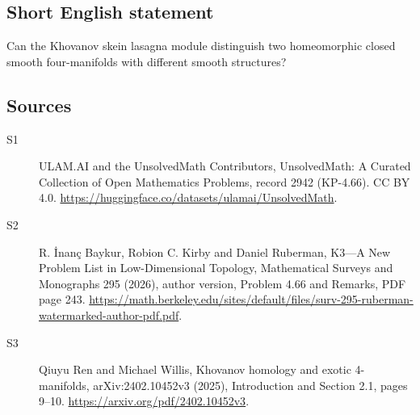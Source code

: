 \documentclass[11pt]{article}
\begin{document}
\subsection{Short English statement}
Can the Khovanov skein lasagna module distinguish two homeomorphic closed smooth four-manifolds with different smooth structures?
\subsection{Sources}
\begin{description}
\item[\hypertarget{source:2942:1}{S1}] ULAM.AI and the UnsolvedMath Contributors, UnsolvedMath: A Curated Collection of Open Mathematics Problems, record 2942 (KP-4.66). CC BY 4.0. \url{https://huggingface.co/datasets/ulamai/UnsolvedMath}.
\item[\hypertarget{source:2942:2}{S2}] R. İnanç Baykur, Robion C. Kirby and Daniel Ruberman, K3—A New Problem List in Low-Dimensional Topology, Mathematical Surveys and Monographs 295 (2026), author version, Problem 4.66 and Remarks, PDF page 243. \url{https://math.berkeley.edu/sites/default/files/surv-295-ruberman-watermarked-author-pdf.pdf}.
\item[\hypertarget{source:2942:3}{S3}] Qiuyu Ren and Michael Willis, Khovanov homology and exotic 4-manifolds, arXiv:2402.10452v3 (2025), Introduction and Section 2.1, pages 9--10. \url{https://arxiv.org/pdf/2402.10452v3}.
\end{description}
\label{end:2942}
\end{document}
